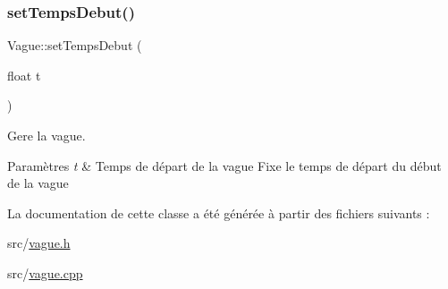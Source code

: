 \subsubsection{\texorpdfstring{set\+Temps\+Debut()}{setTempsDebut()}}
{\footnotesize\ttfamily Vague\+::set\+Temps\+Debut (\begin{DoxyParamCaption}\item[{float}]{t }\end{DoxyParamCaption})}



Gere la vague. 


\begin{DoxyParams}{Paramètres}
{\em t} & Temps de départ de la vague Fixe le temps de départ du début de la vague \\
\hline
\end{DoxyParams}


La documentation de cette classe a été générée à partir des fichiers suivants \+:\begin{DoxyCompactItemize}
\item 
src/\hyperlink{vague_8h}{vague.\+h}\item 
src/\hyperlink{vague_8cpp}{vague.\+cpp}\end{DoxyCompactItemize}
